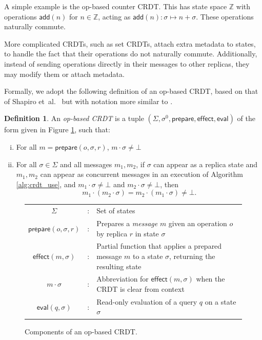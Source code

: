 \documentclass[acmsmall,nonacm]{acmart}
\newcommand{\mb}[1]{\ensuremath{\mathbb{#1}}}
\newcommand{\msf}[1]{\ensuremath{\mathsf{#1}}}
\newcommand{\Z}{\mb{Z}}
\theoremstyle{plain}
\theoremstyle{definition}
\newtheorem{mydef}[mythm]{Definition}
\begin{document}
A simple example is the op-based counter CRDT.  This has state space $\Z$ with operations $\msf{add}(n)$ for $n \in \Z$, acting as $\msf{add}(n): \sigma \mapsto n + \sigma$.  These operations naturally commute.

More complicated CRDTs, such as set CRDTs, attach extra metadata to states, to handle the fact that their operations do not naturally commute.  Additionally, instead of sending operations directly in their messages to other replicas, they may modify them or attach metadata.

Formally, we adopt the following definition of an op-based CRDT, based on that of Shapiro et~al.\ \cite{crdt_survey_2011} but with notation more similar to \cite[\S 3]{pure_op_based_crdts_extended}.
\begin{mydef}
\label{def:crdt}
An \emph{op-based CRDT} is a tuple $(\Sigma, \sigma^0, \msf{prepare}, \msf{effect}, \msf{eval})$ of the form given in Figure \ref{fig:op-based}, such that:
\begin{enumerate}[(i)]
   \item For all $m = \msf{prepare}(o, \sigma, r)$, $m \cdot \sigma \neq \bot$
   \item For all $\sigma \in \Sigma$ and all messages $m_1, m_2$, if $\sigma$ can appear as a replica state and $m_1, m_2$ can appear as concurrent messages in an execution of Algorithm \ref{alg:crdt_use}, and $m_1 \cdot \sigma \neq \bot$ and $m_2 \cdot \sigma \neq \bot$, then
    \[
    m_1 \cdot (m_2 \cdot \sigma) = m_2 \cdot (m_1 \cdot \sigma) \neq \bot.
    \]
\end{enumerate}
\end{mydef}

\begin{figure}
\begin{tabular}{ccp{4.9cm}}
$\Sigma$ & : & Set of states \\
$\msf{prepare}(o, \sigma, r)$ & : & Prepares a \textit{message} $m$ given an operation $o$ by replica $r$ in state $\sigma$ \\
$\msf{effect}(m, \sigma)$ & : & Partial function that applies a prepared message $m$ to a state $\sigma$, returning the resulting state \\
$m \cdot \sigma$ & : & Abbreviation for $\msf{effect}(m, \sigma)$ when the CRDT is clear from context \\
$\msf{eval}(q, \sigma)$ & : & Read-only evaluation of a query $q$ on a state $\sigma$
\end{tabular}
\caption{Components of an op-based CRDT.}
\label{fig:op-based}
\end{figure}
\end{document}
